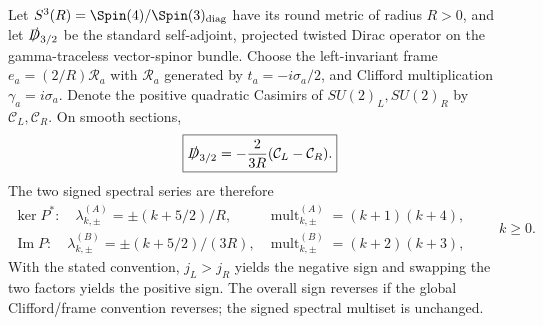 \documentclass[11pt,a4paper]{article}
\begin{document}
\begin{theorem}
\label{p2f:thm:v260-rs-signed-casimir}
Let \(S^3(R)=\Spin(4)/\Spin(3)_{\rm diag}\) have its round metric
of radius \(R>0\), and let \(\slashed D_{3/2}\) be the standard
self-adjoint, projected twisted Dirac operator on the gamma-traceless
vector-spinor bundle. Choose the left-invariant frame
\(e_a=(2/R)\mathscr R_a\) with \(\mathscr R_a\) generated by
\(t_a=-i\sigma_a/2\), and Clifford multiplication
\(\gamma_a=i\sigma_a\). Denote the positive quadratic Casimirs of
\(SU(2)_L,SU(2)_R\) by \(\mathcal C_L,\mathcal C_R\). On smooth
sections,
\[
 \boxed{\slashed D_{3/2}=-\frac{2}{3R}(\mathcal C_L-\mathcal C_R).}
\]
The two signed spectral series are therefore
\[
 \begin{array}{ll}
 \ker P^*:\quad \lambda_{k,\pm}^{(A)}=\pm(k+5/2)/R,
 &\operatorname{mult}_{k,\pm}^{(A)}=(k+1)(k+4),\\[2pt]
 \operatorname{Im}P:\quad \lambda_{k,\pm}^{(B)}=\pm(k+5/2)/(3R),
 &\operatorname{mult}_{k,\pm}^{(B)}=(k+2)(k+3),
 \end{array}\qquad k\ge0.
\]
With the stated convention, \(j_L>j_R\) yields the negative sign and
swapping the two factors yields the positive sign. The overall sign
reverses if the global Clifford/frame convention reverses; the signed
spectral multiset is unchanged.
\end{theorem}
\end{document}
